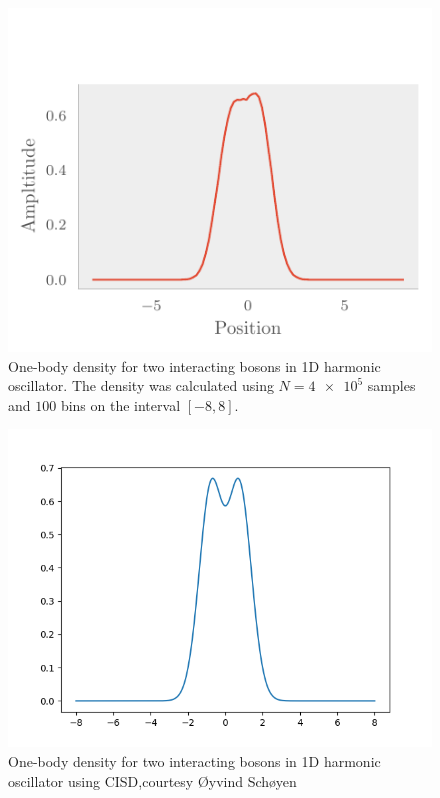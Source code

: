 \begin{figure}[H]
	\includegraphics[]{figures/many_part_int_onebody.pdf}
	\caption{One-body density for two interacting bosons in 1D harmonic
      oscillator. The density was calculated using $N=\num{4e5}$ samples and $100$
      bins on the interval $[-8,8]$.} 
	\label{fig:many_part_int_onebody}
\end{figure}

\begin{figure}[H]
	\includegraphics[scale = 0.4]{figures/oyvind.png}
	\caption{One-body density for two interacting bosons in 1D harmonic oscillator using CISD,courtesy Øyvind Schøyen}
	\label{fig:many_part_int_onebody}
\end{figure}

